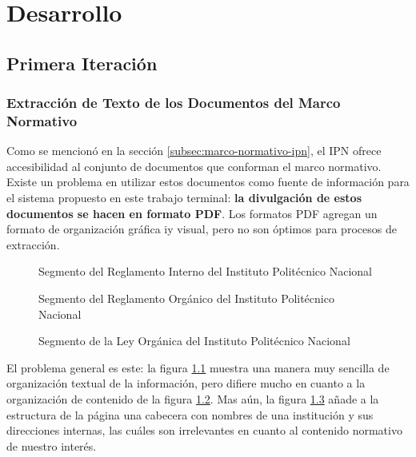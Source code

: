\chapter{Desarrollo}

\section{Primera Iteración}

\subsection{Extracción de Texto de los Documentos del Marco Normativo}

Como se mencionó en la sección \ref{subsec:marco-normativo-ipn}, el IPN ofrece accesibilidad al conjunto de documentos que conforman el marco normativo. Existe un problema en utilizar estos documentos como fuente de información para el sistema propuesto en este trabajo terminal: \textbf{la divulgación de estos documentos se hacen en formato PDF}. Los formatos PDF agregan un formato de organización gráfica iy visual, pero no son óptimos para procesos de extracción.


\begin{figure}[ht]
    \centering
    \caption{Segmento del Reglamento Interno del Instituto Politécnico Nacional}
    \label{fig:ejemplo_1_reglamento_interno}
\end{figure}

\begin{figure}[ht]
    \centering
    \caption{Segmento del Reglamento Orgánico del Instituto Politécnico Nacional}
    \label{fig:ejemplo_2_reglamento_organico}
\end{figure}

\begin{figure}[ht]
    \centering
    \caption{Segmento de la Ley Orgánica del Instituto Politécnico Nacional}
    \label{fig:ejemplo_3_ley_organica}
\end{figure}

El problema general es este: la figura \ref{fig:ejemplo_1_reglamento_interno} muestra una manera muy sencilla de organización textual de la información, pero difiere mucho en cuanto a la organización de contenido de la figura \ref{fig:ejemplo_2_reglamento_organico}. Mas aún, la figura \ref{fig:ejemplo_3_ley_organica} añade a la estructura de la página una cabecera con nombres de una institución y sus direcciones internas, las cuáles son irrelevantes en cuanto al contenido normativo de nuestro interés.
 
